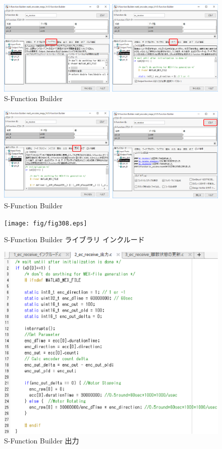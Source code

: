 \begin{figure}[htbp]
    \centering
    \includegraphics[width=380pt]{fig/fig306.eps}
    \caption{S-Function Builder}
    \label{fig306}
\end{figure}

\begin{figure}[htbp]
    \centering
    \includegraphics[width=380pt]{fig/fig307.eps}
    \caption{S-Function Builder}
    \label{fig307}
\end{figure}   

\begin{figure}[htbp]
    \centering
    \texttt{[image: fig/fig308.eps]}
    \caption{S-Function Builder ライブラリ インクルード}
    \label{fig308}
\end{figure}   

\begin{figure}[htbp]
    \centering
    \includegraphics[width=320pt]{fig/fig309.eps}
    \caption{S-Function Builder 出力}
    \label{fig309}
\end{figure}  

